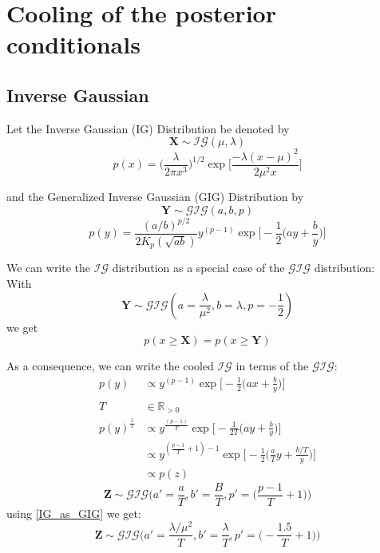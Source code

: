 \pagebreak
\section{Cooling of the posterior conditionals}

\subsection{Inverse Gaussian}
Let the Inverse Gaussian (IG) Distribution be denoted by
$$
\bm{X} \sim \mathcal{IG}(\mu, \lambda)
$$
$$
p(x) = \Big(\frac{\lambda}{2\pi x^3}\Big)^{1/2}\exp \Big[ \frac{-\lambda(x-\mu)^2}{2\mu^2 x} \Big]
$$

and the Generalized Inverse Gaussian (GIG) Distribution by
$$
\bm{Y} \sim \mathcal{GIG}(a, b, p)
$$
$$
p(y) = \frac{(a/b)^{p/2}}{2K_p(\sqrt{ab})} y^{(p-1)} \exp\Big[-\frac{1}{2}\big(ay + \frac{b}{y}\big)\Big]
$$

We can write the $\mathcal{IG}$ distribution as a special case of the $\mathcal{GIG}$ distribution:
\\
With  
\begin{equation}
\bm{Y} \sim \mathcal{GIG}(a=\frac{\lambda}{\mu^2}, b=\lambda, p=-\frac{1}{2})
\label{IG_as_GIG}
\end{equation}
we get
$$p(x\geq\bm{X}) = p(x\geq\bm{Y})$$

As a consequence, we can write the cooled $\mathcal{IG}$ in terms of the $\mathcal{GIG}$:
\begin{align*}
p(y) &\propto
y^{(p-1)} \exp\Big[-\frac{1}{2}\big(ax + \frac{b}{y}\big)\Big]
\\
\\
T &\in \mathbb{R}_{>0}
\\
p(y)^\frac{1}{T} &\propto
y^{\frac{(p-1)}{T}} \exp\Big[-\frac{1}{2T}\big(ay + \frac{b}{y}\big)\Big]
\\
&\propto 
y^{(\frac{p-1}{T}+1)-1} \exp\Big[-\frac{1}{2}\Big(\frac{a}{T}y + \frac{b/T}{y}\Big)\Big]
\\
&\propto p(z)
\end{align*}
$$
\bm{Z} \sim \mathcal{GIG}\bigg(a'=\frac{a}{T}, b'=\frac{B}{T}, p'=\Big(\frac{p-1}{T}+1\Big)\bigg)
$$
using \autoref{IG_as_GIG} we get:
\begin{equation}
\bm{Z} \sim \mathcal{GIG}\bigg(a'=\frac{\lambda/\mu^2}{T}, b'=\frac{\lambda}{T}, p'=\Big(-\frac{1.5}{T}+1\Big)\bigg)
\end{equation}


